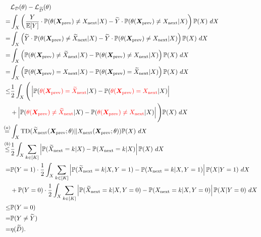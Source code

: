 \begin{align*}
     &{\mathcal L}_{\mathcal D}(\theta) - {\mathcal L}_{\widetilde{\mathcal D}}(\theta) \\
    =& \int_{X} \left( \frac{Y}{\mathbb{E}[Y]} \cdot \mathbb P({\theta(\bm X_{\text{prev}})\ne  X_{\text{next}} }| X) - \widetilde Y \cdot \mathbb P({\theta(\bm X_{\text{prev}}) \ne X_{\text{next}}} | X) \right) \mathbb P(X)   ~dX \\
    =& \int_{X} \left( \widetilde Y \cdot \mathbb P({\theta(\bm X_{\text{prev}})\ne \widetilde X_{\text{next}} }| X) - \widetilde Y \cdot \mathbb P({\theta(\bm X_{\text{prev}}) \ne X_{\text{next}}} | X) \right) \mathbb P(X)   ~dX \\
    =& \int_{X} \left(  \mathbb P({\theta(\bm X_{\text{prev}})\ne \widetilde X_{\text{next}} }| X) -  \mathbb P({\theta(\bm X_{\text{prev}}) \ne X_{\text{next}}} | X) \right) \mathbb P(X)   ~dX \\
    =& \int_{X} \left(  \mathbb P({\theta(\bm X_{\text{prev}}) =  X_{\text{next}} }| X) -  \mathbb P({\theta(\bm X_{\text{prev}}) = \widetilde X_{\text{next}}} | X) \right) \mathbb P(X)   ~dX \\
    \le & \frac{1}{2} \int_{X} \Bigg(\left| \mathbb P({\color{red}\theta(\bm X_{\text{prev}})=\widetilde X_{\text{next}} }| X) - \mathbb P({\color{red}\theta(\bm X_{\text{prev}}) = X_{\text{next}}} | X) \right| \\
    & + \left| \mathbb P({\color{red}\theta(\bm X_{\text{prev}}) \ne \widetilde X_{\text{next}} }| X) - \mathbb P({\color{red}\theta(\bm X_{\text{prev}}) \ne  X_{\text{next}}} | X) \right| \Bigg) \mathbb P(X)  ~dX  \\
    \overset{(a)}{=} &  \int_{X} \text{TD}(\widetilde X_{\text{next}}(\bm X_{\text{prev}}; \theta) || X_{\text{next}}(\bm X_{\text{prev}};\theta))  \mathbb P(X)    ~dX \\
    \overset{(b)}{\le} &   \frac{1}{2}\int_{X}\sum_{k\in[K]}\left | \mathbb P(\widetilde X_{\text{next}} = k | X) - \mathbb P(X_{\text{next}}=k| X)  \right | \mathbb P(X) ~dX\\
    = & \mathbb P(Y=1) \cdot \frac{1}{2}\int_{X}\sum_{k\in[K]}\left | \mathbb P(\widetilde X_{\text{next}} = k | X, Y=1) - \mathbb P(X_{\text{next}}=k| X, Y=1)  \right | \mathbb P(X|Y=1)  ~dX \\
    & + \mathbb P(Y=0) \cdot \frac{1}{2}\int_{X}\sum_{k\in[K]}\left | \mathbb P(\widetilde X_{\text{next}} = k | X, Y=0) - \mathbb P(X_{\text{next}}=k| X, Y=0)  \right | \mathbb P(X|Y=0)  ~dX\\
    \le & \mathbb P(Y=0) \\
    = & \mathbb P(Y\ne \widetilde Y) \\
    = & \eta(\widetilde D).
\end{align*}
